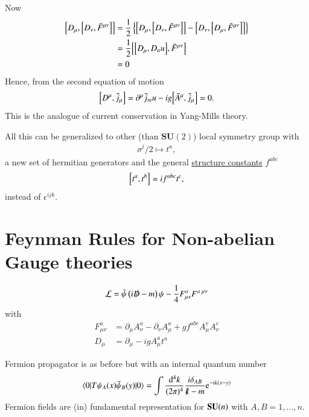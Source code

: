 Now
\begin{align*}
   \comm{D_\mu}{\comm{D_\nu}{\tilde{F}^{\mu\nu}}} &= \frac{1}{2} \left\{ \comm{D_\mu}{\comm{D_\nu}{\tilde{F}^{\mu\nu}}}  - \comm{D_\nu}{\comm{D_\mu}{\tilde{F}^{\mu\nu}}}\right\} \\
                                                  &= \frac{1}{2} \comm{\comm{D_\mu}{D_nu}}{\tilde{F}^{\mu\nu}}  \\
                                                  &= 0
\end{align*}
Hence, from the second equation of motion
\begin{align}
   \comm{D^\mu}{\tilde{j}_\mu} = \partial^\mu \tilde{j}_mu - ig \comm{\tilde{A}^\mu}{\tilde{j}_\mu} = 0.
\end{align}
This is the analogue of current conservation in Yang-Mills theory.

All this can be generalized to other (than $\mathbf{SU}(2)$) local symmetry group with 
\begin{align*}
   \sigma^i / 2 \mapsto t^a,
\end{align*}
a new set of hermitian generators and the general \underline{structure constants} $f^{abc}$
\begin{align}
   \comm{t^a}{t^b} = i f^{abc} t^c,
\end{align}
instead of $\epsilon^{ijk}$.

\section{Feynman Rules for Non-abelian Gauge theories}
\begin{align}
   \mathcal{L} = \bar{\psi} \left( i \slashed{D} - m \right)\psi - \frac{1}{4} F_{\mu\nu}^a F^{a\; \mu\nu}
\end{align}
with 
\begin{align*}
   F^a_{\mu\nu} &= \partial_\mu A_\nu^a - \partial_\nu A^a_\mu + g f^{abc} A_\mu^v A_\nu^c  \\
   D_\mu & = \partial_\mu - igA_\mu^a t^a
\end{align*}

Fermion propagator is as before but with an internal quantum number
\begin{align}
   \braket{0 | T \psi_A (x) \bar{\psi}_B(y) | 0} = \int \frac{\dd[4]{k}}{(2\pi)^4} \frac{i\delta_{AB}}{\slashed{k}-m} \mathrm{e}^{-ik(x-y)} 
\end{align}
Fermion fields are (in) fundamental representation for $\mathbf{SU}(n)$ with $A,B=1,\dots,n$.

